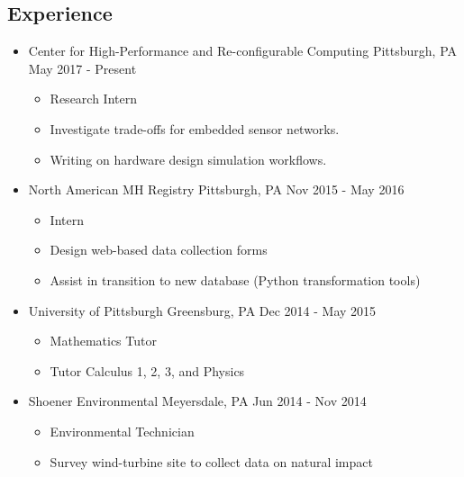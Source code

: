 \documentclass[18pt]{article}
\providecommand{\tightlist}{
    \setlength{\itemsep}{0pt}\setlength{\parskip}{0pt}
}
\begin{document}
    \subsection*{Experience}\label{experience}
      \begin{itemize}\tightlist
        
        \item Center for High-Performance and Re-configurable Computing \textbar{} Pittsburgh, PA \textbar{} May 2017 - Present
        \begin{itemize}\tightlist
          \item Research Intern
          \item Investigate trade-offs for embedded sensor networks.
          \item Writing on hardware design simulation workflows.
      	\end{itemize}
        
        \item North American MH Registry \textbar{} Pittsburgh, PA \textbar{} Nov 2015 - May 2016
        \begin{itemize}\tightlist
          \item Intern
          \item Design web-based data collection forms
          \item Assist in transition to new database (Python transformation tools)
        \end{itemize}

        \item University of Pittsburgh \textbar{} Greensburg, PA \textbar{} Dec 2014 - May 2015
        \begin{itemize}\tightlist
          \item Mathematics Tutor
          \item Tutor Calculus 1, 2, 3, and Physics
        \end{itemize}
        
        \item Shoener Environmental \textbar{} Meyersdale, PA \textbar{} Jun 2014 - Nov 2014
        \begin{itemize}\tightlist
          \item Environmental Technician
          \item Survey wind-turbine site to collect data on natural impact
        \end{itemize}

      \end{itemize} %
      
\end{document}

